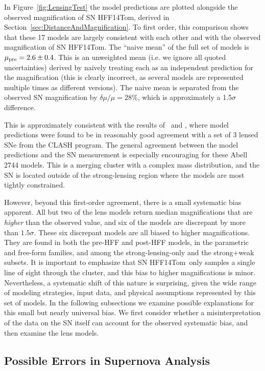 \documentclass[iop]{emulateapj}
\def\P14{\citetalias{Patel:2014}}
\def\tomas{HFF14Tom}
\begin{document}
\medskip
In Figure~\ref{fig:LensingTest} the model predictions are plotted
alongside the observed magnification of SN \tomas, derived in
Section~\ref{sec:DistanceAndMagnification}.  To first order, this
comparison shows that these 17 models are largely consistent with each
other and with the observed magnification of SN \tomas. The
``naive mean'' of the full set of models is $\mu_{\rm pre}=2.6\pm0.4$.
This is an unweighted mean (i.e. we ignore all quoted uncertainties)
derived by naively treating each as an independent
prediction for the magnification (this is clearly incorrect, as
several models are represented multiple times as different versions).
The naive mean is separated from the observed SN magnification by
$\delta\mu/\mu=28\%$, which is approximately a 1.5$\sigma$ difference.

This is approximately consistent with the results
of \P14\ and \citet{Nordin:2014}, where
model predictions were found to be in reasonably good agreement with a
set of 3 lensed SNe from the CLASH program.  The general agreement
between the model predictions and the SN measurement is especially
encouraging for these Abell 2744 models. This is a merging cluster
with a complex mass distribution, and the SN is located
outside of the strong-lensing region where the models are most tightly
constrained.

However, beyond this first-order agreement, there is a small
systematic bias apparent. All but two of the lens models return median
magnifications that are {\it higher} than the observed value, and six
of the models are discrepant by more than $1.5\sigma$. These
six discrepant models are all biased to higher magnifications. They
are found in both the pre-HFF and post-HFF models, in the parametric
and free-form families, and among the strong-lensing-only and the
strong+weak subsets.  It is important to emphasize that SN \tomas\
only samples a single line of sight through the cluster, and this bias
to higher magnifications is minor.  Nevertheless, a systematic shift
of this nature is surprising, given the wide range of modeling
strategies, input data, and physical assumptions represented by this
set of models.  In the following subsections we examine possible
explanations for this small but nearly universal bias.  We first
consider whether a misinterpretation of the data on the SN itself can
account for the observed systematic bias, and then examine the lens
models.

\subsection{Possible Errors in Supernova Analysis}
\label{sec:SupernovaError}
\end{document}
